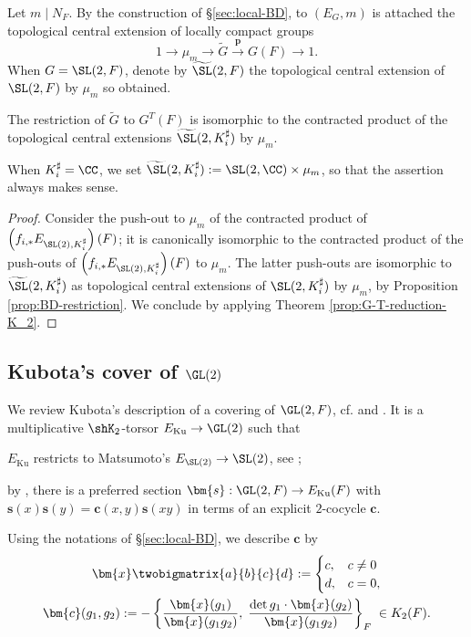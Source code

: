 \documentclass[a4paper,10pt]{article}
\begin{document}
Let $m \mid N_F$. By the construction of \S\ref{sec:local-BD}, to $(E_G, m)$ is attached the topological central extension of locally compact groups
\begin{equation}\label{eqn:G-BD-cext}
	1 \to \mu_m \to \tilde{G} \xrightarrow{\bm{p}} G(F) \to 1.
\end{equation}
When $G = \SL(2,F)$, denote by $\widetilde{\SL}(2, F)$ the topological central extension of $\SL(2,F)$ by $\mu_m$ so obtained.

\begin{theorem}\label{prop:G-T-reduction}
	The restriction of $\tilde{G}$ to $G^T(F)$ is isomorphic to the contracted product of the topological central extensions $\widetilde{\SL}(2, K_i^\sharp)$ by $\mu_m$.
\end{theorem}
When $K_i^\sharp = \CC$, we set $\widetilde{\SL}(2, K_i^\sharp) := \SL(2,\CC) \times \mu_m$, so that the assertion always makes sense.
\begin{proof}
	Consider the push-out to $\mu_m$ of the contracted product of $\left( f_{i,*} E_{\SL(2), K_i^\sharp} \right)(F)$; it is canonically isomorphic to the contracted product of the push-outs of $\left( f_{i,*} E_{\SL(2), K_i^\sharp} \right)(F)$ to $\mu_m$. The latter push-outs are isomorphic to $\widetilde{\SL}(2, K_i^\sharp)$ as topological central extensions of $\SL(2, K_i^\sharp)$ by $\mu_m$, by Proposition \ref{prop:BD-restriction}. We conclude by applying Theorem \ref{prop:G-T-reduction-K_2}.
\end{proof}


\subsection{Kubota's cover of \texorpdfstring{$\GL(2)$}{GL2}}\label{sec:Kubota}
We review Kubota's description \cite{Ku69} of a covering of $\GL(2,F)$, cf. \cite[0.1]{KP84} and \cite[\S 16.2]{GG}. It is a multiplicative $\shK_2$-torsor $E_\text{Ku} \to \GL(2)$ such that
\begin{compactitem}
	\item $E_\text{Ku}$ restricts to Matsumoto's $E_{\SL(2)} \to \SL(2)$, see \cite[0.1]{KP84};
	\item by \cite[p.41]{KP84}, there is a preferred section $\bm{s}: \GL(2,F) \to E_\text{Ku}(F)$ with $\bm{s}(x)\bm{s}(y) = \bm{c}(x,y) \bm{s}(xy)$ in terms of an explicit $2$-cocycle $\bm{c}$.
\end{compactitem} 
Using the notations of \S\ref{sec:local-BD}, we describe $\bm{c}$ by
\begin{equation}\label{eqn:Kubota-cocycle}
	\begin{gathered}
		\bm{x}\twobigmatrix{a}{b}{c}{d} := \begin{cases}
		c, & c \neq 0 \\
		d, & c = 0,
	\end{cases} \\
	\bm{c}(g_1, g_2) := - \left\{ \dfrac{ \bm{x}(g_1) }{ \bm{x}(g_1 g_2) }, \; \dfrac{ \det g_1 \cdot \bm{x}(g_2) }{ \bm{x}(g_1 g_2) } \right\}_F \; \in K_2(F).
\end{gathered}\end{equation}
\end{document}
